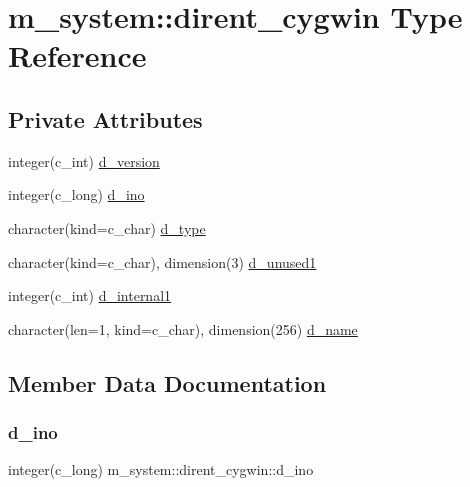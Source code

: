 \hypertarget{structm__system_1_1dirent__cygwin}{}\section{m\+\_\+system\+:\+:dirent\+\_\+cygwin Type Reference}
\label{structm__system_1_1dirent__cygwin}
\subsection*{Private Attributes}
\begin{DoxyCompactItemize}
\item 
integer(c\+\_\+int) \mbox{\hyperlink{structm__system_1_1dirent__cygwin_a406355db287a68f3939379a9e2337484}{d\+\_\+version}}
\item 
integer(c\+\_\+long) \mbox{\hyperlink{structm__system_1_1dirent__cygwin_aaba36e38344bc1aa3da128a142fecd13}{d\+\_\+ino}}
\item 
character(kind=c\+\_\+char) \mbox{\hyperlink{structm__system_1_1dirent__cygwin_a416199c581f2d978d4ff238ae11de028}{d\+\_\+type}}
\item 
character(kind=c\+\_\+char), dimension(3) \mbox{\hyperlink{structm__system_1_1dirent__cygwin_ae193da2503dd1c4368b288bfb2677369}{d\+\_\+unused1}}
\item 
integer(c\+\_\+int) \mbox{\hyperlink{structm__system_1_1dirent__cygwin_a87c389181b48af24ef039be0d3ef110d}{d\+\_\+internal1}}
\item 
character(len=1, kind=c\+\_\+char), dimension(256) \mbox{\hyperlink{structm__system_1_1dirent__cygwin_ae793965c099bb7d8ef2d753e1fb1108a}{d\+\_\+name}}
\end{DoxyCompactItemize}


\subsection{Member Data Documentation}
\mbox{\label{structm__system_1_1dirent__cygwin_aaba36e38344bc1aa3da128a142fecd13}} 
\subsubsection{\texorpdfstring{d\+\_\+ino}{d\_ino}}
{\footnotesize\ttfamily integer(c\+\_\+long) m\+\_\+system\+::dirent\+\_\+cygwin\+::d\+\_\+ino\hspace{0.3cm}{\ttfamily [private]}}

